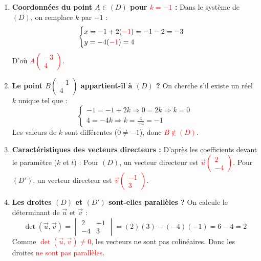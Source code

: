 \documentclass[12pt,a4paper]{article}
\begin{document}
\begin{enumerate}
    \item \textbf{Coordonnées du point $A \in (D)$ pour \textcolor{red}{$k = -1$} :}
    Dans le système de $(D)$, on remplace $k$ par $-1$ :
    \[
    \begin{cases} x = -1 + 2(\textcolor{red}{-1}) = -1 - 2 = -3 \\ y = -4(\textcolor{red}{-1}) = 4 \end{cases}
    \]
    D'où \textcolor{red}{$A \begin{pmatrix} -3 \\ 4 \end{pmatrix}$}.

    \item \textbf{Le point $B \begin{pmatrix} -1 \\ 4 \end{pmatrix}$ appartient-il à $(D)$ ?}
    On cherche s'il existe un réel $k$ unique tel que :
    \[
    \begin{cases} -1 = -1 + 2k \Rightarrow 0 = 2k \Rightarrow k = 0 \\ 4 = -4k \Rightarrow k = \frac{4}{-4} = -1 \end{cases}
    \]
    Les valeurs de $k$ sont différentes ($0 \neq -1$), donc \textcolor{red}{$B \notin (D)$}.

    \item \textbf{Caractéristiques des vecteurs directeurs :}
    D'après les coefficients devant le paramètre ($k$ et $t$) :
    Pour $(D)$, un vecteur directeur est \textcolor{red}{$\vec{u} \begin{pmatrix} 2 \\ -4 \end{pmatrix}$}.
    Pour $(D')$, un vecteur directeur est \textcolor{red}{$\vec{v} \begin{pmatrix} -1 \\ 3 \end{pmatrix}$}.

    \item \textbf{Les droites $(D)$ et $(D')$ sont-elles parallèles ?}
    On calcule le déterminant de $\vec{u}$ et $\vec{v}$ :
    \[ \det(\vec{u}, \vec{v}) = \begin{vmatrix} 2 & -1 \\ -4 & 3 \end{vmatrix} = (2)(3) - (-4)(-1) = 6 - 4 = 2 \]
    Comme \textcolor{red}{$\det(\vec{u}, \vec{v}) \neq 0$}, les vecteurs ne sont pas colinéaires. 
    Donc les droites \textcolor{red}{ne sont pas parallèles}.


\end{enumerate}
\end{document}
